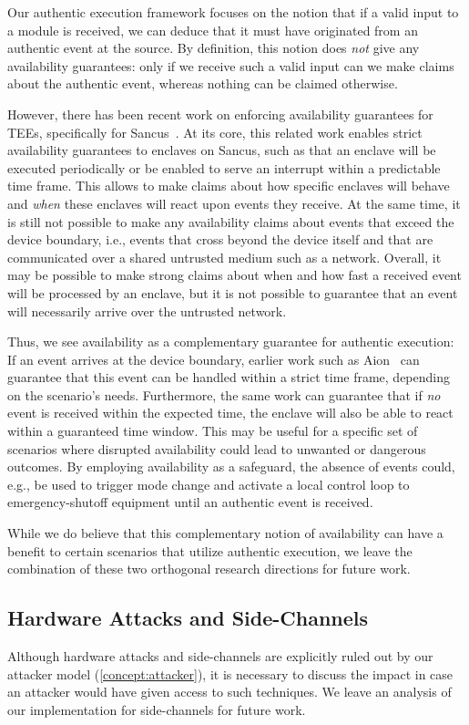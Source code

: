 Our authentic execution framework focuses on the notion that if a valid input to
a module is received, we can deduce that it must have originated from an
authentic event at the source. By definition, this notion does \emph{not} give
any availability guarantees: only if we receive such a valid input can we make
claims about the authentic event, whereas nothing can be claimed otherwise.

However, there has been recent work on enforcing availability guarantees for
TEEs, specifically for Sancus~\cite{alder_2021_aion}. At its core, this related
work enables strict availability guarantees to enclaves on Sancus, such as that
an enclave will be executed periodically or be enabled to serve an interrupt
within a predictable time frame. This allows to make claims about how specific
enclaves will behave and \emph{when} these enclaves will react upon events they
receive. At the same time, it is still not possible to make any availability
claims about events that exceed the device boundary, i.e., events that cross
beyond the device itself and that are communicated over a shared untrusted
medium such as a network. Overall, it may be possible to make strong claims
about when and how fast a received event will be processed by an enclave, but it
is not possible to guarantee that an event will necessarily arrive over the
untrusted network.

Thus, we see availability as a complementary guarantee for authentic execution:
If an event arrives at the device boundary, earlier work such as
Aion~\cite{alder_2021_aion} can guarantee that this event can be handled within
a strict time frame, depending on the scenario's needs. Furthermore, the same
work can guarantee that if \emph{no} event is received within the expected time,
the enclave will also be able to react within a guaranteed time window. This may
be useful for a specific set of scenarios where disrupted availability could
lead to unwanted or dangerous outcomes. By employing availability as a
safeguard, the absence of events could, e.g., be used to trigger mode change and
activate a local control loop to emergency-shutoff equipment until an authentic
event is received.

While we do believe that this complementary notion of availability can have a
benefit to certain scenarios that utilize authentic execution, we leave the
combination of these two orthogonal research directions for future work.

\subsection{Hardware Attacks and Side-Channels}
%
Although hardware attacks and side-channels are explicitly ruled out by our
attacker model (\cref{concept:attacker}), it is necessary to discuss the impact
in case an attacker would have given access to such techniques. We leave an
analysis of our implementation for side-channels for future work.


